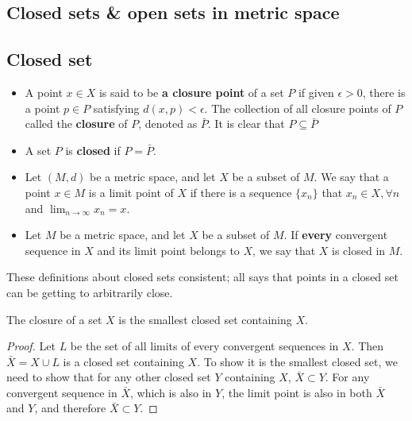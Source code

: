 \begin{refsection}
\section{Closed sets \& open sets in metric space}
\subsection{Closed set}
\begin{definition}
\cite[25]{luenberger1969optimization}
\begin{itemize}
	\item A point $x\in X$ is said to be \textbf{a closure point} of a set $P$ if given $\epsilon >0$, there is a point $p \in P$ satisfying $d(x,p)<\epsilon$. The collection of all closure points of $P$ called the \textbf{closure} of $P$, denoted as $\bar{P}$. It is clear that $P\subseteq \bar{P}$ 
	\item A set $P$ is \textbf{closed} if $P = \bar{P}$.
\end{itemize}
\end{definition}

\begin{definition}
	\cite[128-129]{johnsonbaugh2010foundations}\hfill
\begin{itemize}
	\item Let $(M,d)$ be a metric space, and let $X$ be a subset of $M$. We say that a point $x \in M$ is a limit point of $X$ if there is a sequence $\{x_n\}$ that $x_n\in X,\forall n$ and $\lim_{n \rightarrow \infty} x_n = x$.
	\item Let $M$ be a metric space, and let $X$ be a subset of $M$. If \textbf{every} convergent sequence in $X$ and its limit point belongs to $X$, we say that $X$ is closed in $M$.
\end{itemize}	
\end{definition}
	
\begin{remark}
	These definitions about closed sets consistent; all says that points in a closed set can be getting to arbitrarily close. 
\end{remark}



\begin{lemma}
The closure of a set $X$ is the smallest closed set containing $X$. 
\end{lemma}
\begin{proof}
Let $L$ be the set of all limits of every convergent sequences in $X$. Then $\bar{X} = X\cup L$ is a closed set containing $X$. To show it is the smallest closed set, we need to show that for any other closed set $Y$ containing $X$, $\bar{X}\subset Y$. For any convergent sequence in $\bar{X}$, which is also in $Y$, the limit point is also in both $\bar{X}$ and $Y$, and therefore $\bar{X}\subset Y$.
\end{proof}




\end{refsection}
